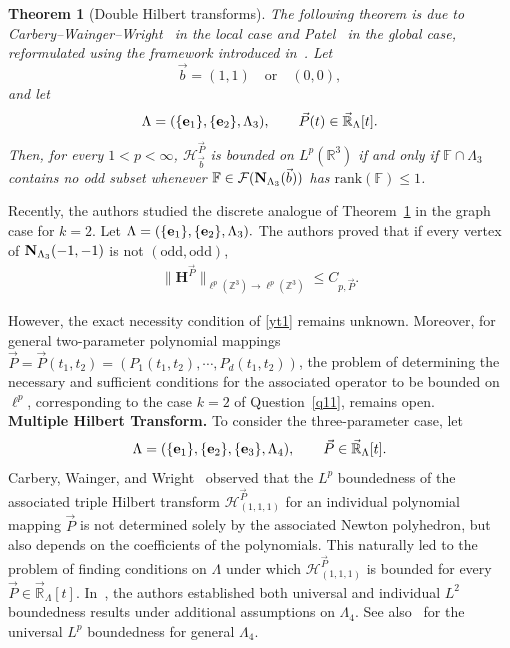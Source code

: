 \documentclass[10pt,a4paper]{amsart}
\newtheorem{theorem}{Theorem}\numberwithin{theorem}{section}
\numberwithin{equation}{section}
\begin{document}
\begin{theorem}[Double Hilbert transforms]
	\label{DCP}
	The following theorem is due to
	Carbery--Wainger--Wright~\cite{CWW} in the local case and
	Patel~\cite{P2} in the global case, reformulated using the framework
	introduced in~\cite{K}.
	Let
	\[
	\vec b=(1,1)
	\quad\text{or}\quad
	(0,0),
	\]
	and let
	\[
	\Lambda=(\{{\bf e}_1\},\{{\bf e}_2\},\Lambda_3),
	\qquad
	\vec P(t)\in\vec{\mathbb R}_{\Lambda}[t].
	\]
Then, for every $1<p<\infty$,
$\mathcal H_{\vec b}^{\vec P}$ is bounded on $L^p(\mathbb R^3)$
	if and only if
	$\mathbb F\cap\Lambda_3$
	contains no odd subset whenever
	$
	\mathbb F\in
	\mathcal F({\bf N}_{\Lambda_3}(\vec b))
	$
	has     $\text{rank}(\mathbb{F})\le 1$.
\end{theorem}



Recently, the authors \cite{KS}   studied the  discrete
analogue of Theorem~\ref{DCP} in the graph case for $k=2$.
Let
$\Lambda=(\{{\bf e}_1\},\{{\bf e}_2\},\Lambda_3).$
The authors proved that if every vertex of
${\bf N}_{\Lambda_3}(-1,-1)$
is not $(\mathrm{odd},\mathrm{odd})$, 
\begin{align}\label{yt1}
\|\textbf{H}^{\vec P}\|_{\ell^p(\mathbb Z^3)\rightarrow\ell^p(\mathbb Z^3)}
\le C_{p,\vec P}.	
\end{align}

However, the exact necessity condition of \eqref{yt1} remains unknown. Moreover, for general two-parameter polynomial mappings $\vec{P}=\vec{P}(t_1,t_2)=(P_1(t_1,t_2),\cdots,P_{d}(t_1,t_2))$, the problem of determining the necessary and sufficient conditions for   the associated operator to be bounded on $\ell^p$, corresponding to the case $k=2$ of Question~\ref{q11}, remains open.
\\


\noindent\textbf{Multiple Hilbert Transform.}
To consider the three-parameter case, let
\[
\Lambda=(\{{\bf e}_1\},\{{\bf e}_2\},\{{\bf e}_3\},\Lambda_4),
\qquad
\vec P\in\vec{\mathbb R}_{\Lambda}[t].
\]
Carbery, Wainger, and Wright~\cite{CWW2}  observed that the
$L^p$ boundedness of the associated triple Hilbert transform
$\bm{\mathcal{H}}^{\vec P}_{(1,1,1)}$
for an individual polynomial mapping $\vec P$ is not determined solely
by the associated Newton polyhedron, but also depends on the
coefficients of the polynomials. This naturally led to the problem of
finding conditions on $\Lambda$ under which
$\bm{\mathcal{H}}^{\vec P}_{(1,1,1)}$
is bounded for every
$\vec P\in\vec{\mathbb R}_{\Lambda}[t]$.
In~\cite{CWW2}, the authors established both universal and individual
$L^2$ boundedness results under additional assumptions on $\Lambda_4$.
See also~\cite{CHKY} for  the   universal $L^p$ boundedness  for general $\Lambda_4$.
\end{document}
